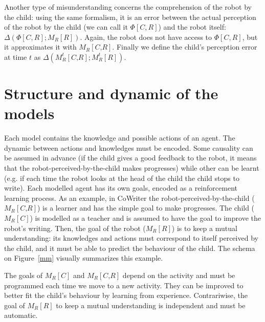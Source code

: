\documentclass[conference]{IEEEtran}
\begin{document}
Another type of misunderstanding concerns the comprehension of the robot by the child: using the same formalism, it is an error between the actual perception of the robot by the child (we can call it $\Phi[C,R]$) and the robot itself: $\Delta \left(\Phi[C,R] ; M_R\left[\textit{R}\right]\right)$. Again, the robot does not have access to $\Phi[C,R]$, but it approximates it with $ M_R\left[\textit{C,R}\right]$. Finally we define the child's perception error at time $t$ as $\Delta \left(M^t_R\left[\textit{C,R}\right] ; M^t_R\left[\textit{R}\right]\right)$.

\section{Structure and dynamic of the models}
Each model contains the knowledge and possible actions of an agent. The dynamic between actions and knowledges must be encoded. Some causality can be assumed in advance (if the child gives a good feedback to the robot, it means that the robot-perceived-by-the-child makes progresses) while other can be learnt (e.g. if each time the robot looks at the head of the child the child stops to write). Each modelled agent has its own goals, encoded as a reinforcement learning process. As an example, in CoWriter the robot-perceived-by-the-child ($ M_R\left[\textit{C,R}\right]$) is a learner and has the simple goal to make progresses. The child ($ M_R\left[\textit{C}\right]$) is modelled as a teacher and is assumed to have the goal to improve the robot's writing. Then, the goal of the robot ($ M_R\left[\textit{R}\right]$) is to keep a mutual understanding: its knowledges and actions must correspond to itself perceived by the child, and it must be able to predict the behaviour of the child. The schema on Figure~\ref{mm} visually summarizes this example.

The goals of $ M_R\left[\textit{C}\right]$ and $ M_R\left[\textit{C,R}\right]$ depend on the activity and must be programmed each time we move to a new activity. They can be improved to better fit the child's behaviour by learning from experience. Contrariwise, the goal of $ M_R\left[\textit{R}\right]$ to keep a mutual understanding is independent and must be automatic. 
\end{document}
